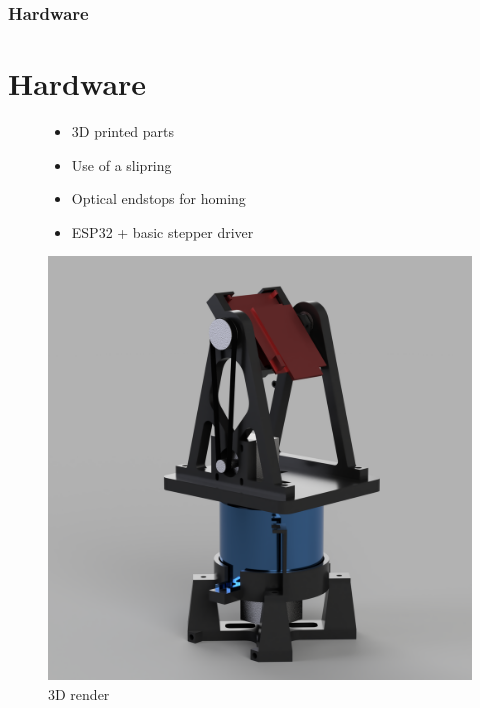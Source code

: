 \documentclass[aspectratio=43]{beamer}
\begin{document}
\begin{frame}[fragile]
  \frametitle{Hardware}
  \section{Hardware}
  \begin{figure}[!htb]
    \begin{minipage}{0.48\textwidth}
      \begin{itemize}
        \item 3D printed parts
        \item Use of a slipring
        \item Optical endstops for homing
        \item ESP32 + basic stepper driver
      \end{itemize}
    \end{minipage}\hfill
    \begin{minipage}{0.48\textwidth}
      \centering
      \includegraphics[height=\linewidth]{../img/whole_assembly_2.png}
      \caption{3D render}
    \end{minipage}
  \end{figure}
\end{frame}
\end{document}
